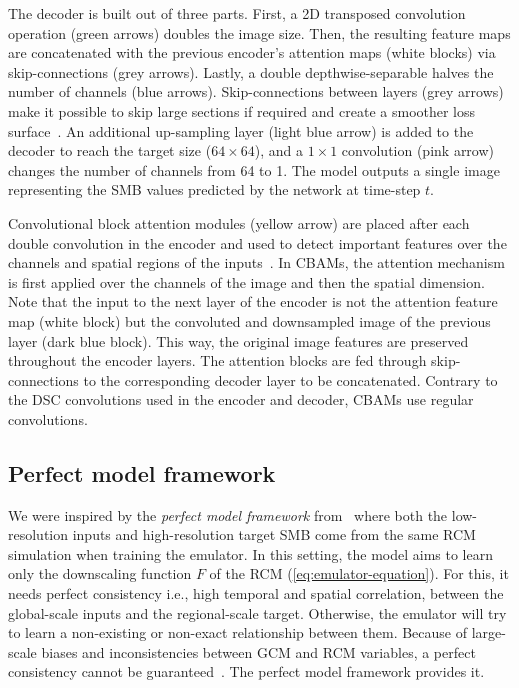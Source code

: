 \documentclass[a4paper,11pt,oneside]{report}
\begin{document}
The decoder is built out of three parts. First, a 2D transposed convolution operation (green arrows) doubles the image size. Then, the resulting feature maps are concatenated with the previous encoder's attention maps (white blocks) via skip-connections (grey arrows). Lastly, a double depthwise-separable halves the number of channels (blue arrows). Skip-connections between layers (grey arrows) make it possible to skip large sections if required and create a smoother loss surface~\cite{Li2017}. An additional up-sampling layer (light blue arrow) is added to the decoder to reach the target size ($64\times 64$), and a $1\times1$ convolution (pink arrow) changes the number of channels from 64 to 1. The model outputs a single image representing the SMB values predicted by the network at time-step $t$.

Convolutional block attention modules (yellow arrow) are placed after each double convolution in the encoder and used to detect important features over the channels and spatial regions of the inputs~\cite{smatunet}. In CBAMs, the attention mechanism is first applied over the channels of the image and then the spatial dimension. Note that the input to the next layer of the encoder is not the attention feature map (white block) but the convoluted and downsampled image of the previous layer (dark blue block). This way, the original image features are preserved throughout the encoder layers. The attention blocks are fed through skip-connections to the corresponding decoder layer to be concatenated. Contrary to the DSC convolutions used in the encoder and decoder, CBAMs use regular convolutions.  

\subsection{Perfect model framework}\label{subsec:perfect-model}

We were inspired by the \textit{perfect model framework} from~\cite{Doury} where both the low-resolution inputs and high-resolution target SMB come from the same RCM simulation when training the emulator. In this setting, the model aims to learn only the downscaling function $F$ of the RCM (\autoref{eq:emulator-equation}). For this, it needs perfect consistency i.e., high temporal and spatial correlation, between the global-scale inputs and the regional-scale target. Otherwise, the emulator will try to learn a non-existing or non-exact relationship between them. Because of large-scale biases and inconsistencies between GCM and RCM variables, a perfect consistency cannot be guaranteed~\cite{Doury, Sanchez2009, Sanchez2018}. The perfect model framework provides it.
\end{document}
